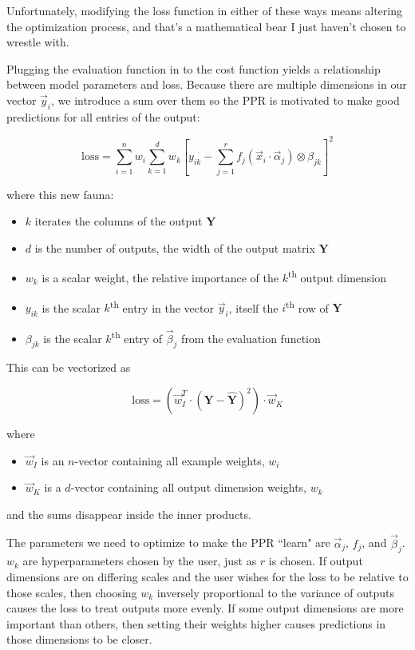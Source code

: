 \documentclass[12pt]{article}
\begin{document}
Unfortunately, modifying the loss function in either of these ways means altering the optimization process, and that's a mathematical bear I just haven't chosen to wrestle with.\newline

Plugging the evaluation function in to the cost function yields a relationship between model parameters and loss. Because there are multiple dimensions in our vector $\vec{y}_i$, we introduce a sum over them so the PPR is motivated to make good predictions for all entries of the output:

$$\text{loss} = \sum_{i=1}^n w_i \sum_{k=1}^d w_k [y_{ik} - \sum_{j=1}^r f_j(\vec{x}_i \cdot \vec{\alpha}_j) \otimes \beta_{jk}]^2$$

where this new fauna:
\begin{itemize}
	\setlength\itemsep{-2mm}
	\item $k$ iterates the columns of the output $\pmb{Y}$
	\item $d$ is the number of outputs, the width of the output matrix $\pmb{Y}$
	\item $w_k$ is a scalar weight, the relative importance of the $k$\textsuperscript{th} output dimension
	\item $y_{ik}$ is the scalar $k$\textsuperscript{th} entry in the vector $\vec{y}_i$, itself the $i$\textsuperscript{th} row of $\pmb{Y}$
	\item $\beta_{jk}$ is the scalar $k$\textsuperscript{th} entry of $\vec{\beta}_j$ from the evaluation function
\end{itemize}

This can be vectorized as

$$\text{loss} = (\vec{w}_I^T \cdot (\pmb{Y} - \pmb{\hat{Y}})^2) \cdot \vec{w}_K$$

where
\begin{itemize}
	\setlength\itemsep{-2mm}
	\item $\vec{w}_I$ is an $n$-vector containing all example weights, $w_i$
	\item $\vec{w}_K$ is a $d$-vector containing all output dimension weights, $w_k$
\end{itemize}
and the sums disappear inside the inner products.\newline

The parameters we need to optimize to make the PPR ``learn" are $\vec{\alpha}_j$, $f_j$, and $\vec{\beta}_j$. $w_k$ are hyperparameters chosen by the user, just as $r$ is chosen. If output dimensions are on differing scales and the user wishes for the loss to be relative to those scales, then choosing $w_k$ inversely proportional to the variance of outputs causes the loss to treat outputs more evenly. If some output dimensions are more important than others, then setting their weights higher causes predictions in those dimensions to be closer.
\end{document}
